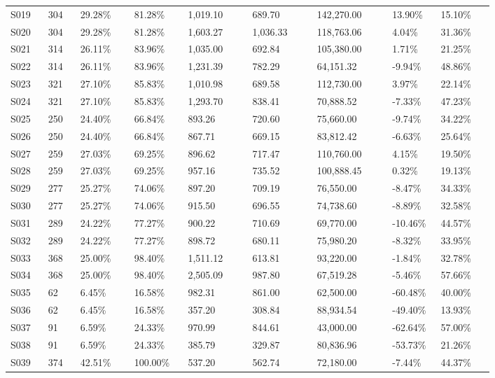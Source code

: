 \begin{longtable}{@{}p{0.07\linewidth}p{0.06\linewidth}p{0.1\linewidth}p{0.1\linewidth}p{0.12\linewidth}p{0.12\linewidth}p{0.14\linewidth}p{0.09\linewidth}p{0.1\linewidth}@{}}
S019 & 304 & 29.28\% & 81.28\% & 1,019.10 & 689.70 & 142,270.00 & 13.90\% & 15.10\% \\
S020 & 304 & 29.28\% & 81.28\% & 1,603.27 & 1,036.33 & 118,763.06 & 4.04\% & 31.36\% \\
S021 & 314 & 26.11\% & 83.96\% & 1,035.00 & 692.84 & 105,380.00 & 1.71\% & 21.25\% \\
S022 & 314 & 26.11\% & 83.96\% & 1,231.39 & 782.29 & 64,151.32 & -9.94\% & 48.86\% \\
S023 & 321 & 27.10\% & 85.83\% & 1,010.98 & 689.58 & 112,730.00 & 3.97\% & 22.14\% \\
S024 & 321 & 27.10\% & 85.83\% & 1,293.70 & 838.41 & 70,888.52 & -7.33\% & 47.23\% \\
S025 & 250 & 24.40\% & 66.84\% & 893.26 & 720.60 & 75,660.00 & -9.74\% & 34.22\% \\
S026 & 250 & 24.40\% & 66.84\% & 867.71 & 669.15 & 83,812.42 & -6.63\% & 25.64\% \\
S027 & 259 & 27.03\% & 69.25\% & 896.62 & 717.47 & 110,760.00 & 4.15\% & 19.50\% \\
S028 & 259 & 27.03\% & 69.25\% & 957.16 & 735.52 & 100,888.45 & 0.32\% & 19.13\% \\
S029 & 277 & 25.27\% & 74.06\% & 897.20 & 709.19 & 76,550.00 & -8.47\% & 34.33\% \\
S030 & 277 & 25.27\% & 74.06\% & 915.50 & 696.55 & 74,738.60 & -8.89\% & 32.58\% \\
S031 & 289 & 24.22\% & 77.27\% & 900.22 & 710.69 & 69,770.00 & -10.46\% & 44.57\% \\
S032 & 289 & 24.22\% & 77.27\% & 898.72 & 680.11 & 75,980.20 & -8.32\% & 33.95\% \\
S033 & 368 & 25.00\% & 98.40\% & 1,511.12 & 613.81 & 93,220.00 & -1.84\% & 32.78\% \\
S034 & 368 & 25.00\% & 98.40\% & 2,505.09 & 987.80 & 67,519.28 & -5.46\% & 57.66\% \\
S035 & 62 & 6.45\% & 16.58\% & 982.31 & 861.00 & 62,500.00 & -60.48\% & 40.00\% \\
S036 & 62 & 6.45\% & 16.58\% & 357.20 & 308.84 & 88,934.54 & -49.40\% & 13.93\% \\
S037 & 91 & 6.59\% & 24.33\% & 970.99 & 844.61 & 43,000.00 & -62.64\% & 57.00\% \\
S038 & 91 & 6.59\% & 24.33\% & 385.79 & 329.87 & 80,836.96 & -53.73\% & 21.26\% \\
S039 & 374 & 42.51\% & 100.00\% & 537.20 & 562.74 & 72,180.00 & -7.44\% & 44.37\% \\

\end{longtable}
